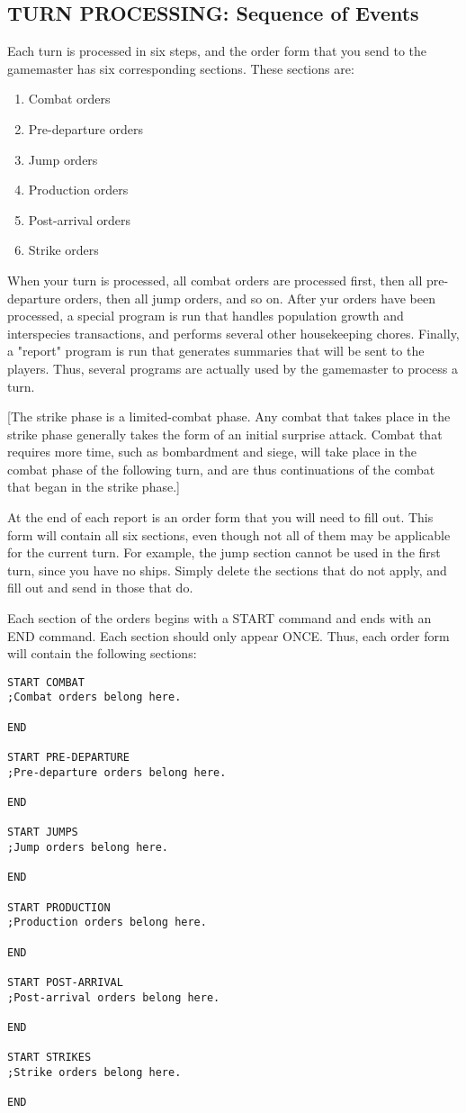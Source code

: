\documentclass[10pt,titlepage]{article}
\begin{document}
\subsection{TURN PROCESSING: Sequence of Events}

Each turn is processed in six steps, and the order form that you send to the
gamemaster has six corresponding sections.  These sections are:

\begin{enumerate}
	\item Combat orders
	\item Pre-departure orders
	\item Jump orders
	\item Production orders
	\item Post-arrival orders	
	\item Strike orders
\end{enumerate}
When your turn is processed, all combat orders are processed first, then all
pre-departure orders, then all jump orders, and so on.  After yur orders have
been processed, a special program is run that handles population growth and
interspecies transactions, and performs several other housekeeping chores.
Finally, a "report" program is run that generates summaries that will be sent
to the players.  Thus, several programs are actually used by the gamemaster
to process a turn.

[The strike phase is a limited-combat phase.  Any combat that takes place
in the strike phase generally takes the form of an initial surprise attack.
Combat that requires more time, such as bombardment and siege, will take place
in the combat phase of the following turn, and are thus continuations of the
combat that began in the strike phase.]

At the end of each report is an order form that you will need to fill out.
This form will contain all six sections, even though not all of them may be
applicable for the current turn.  For example, the jump section cannot be used
in the first turn, since you have no ships.  Simply delete the sections that
do not apply, and fill out and send in those that do.

Each section of the orders begins with a START command and ends with an END
command.  Each section should only appear ONCE.  Thus, each order form will
contain the following sections:
\begin{verbatim}
START COMBAT
;Combat orders belong here.

END

START PRE-DEPARTURE
;Pre-departure orders belong here.

END

START JUMPS
;Jump orders belong here.

END

START PRODUCTION
;Production orders belong here.

END

START POST-ARRIVAL
;Post-arrival orders belong here.

END

START STRIKES
;Strike orders belong here.

END
\end{verbatim} 
\end{document}
